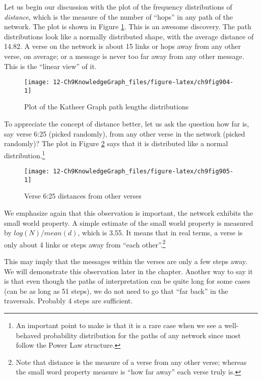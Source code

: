 \documentclass[
]{article}
\begin{document}
Let us begin our discussion with the plot of the frequency distributions of \emph{distance}, which is the measure of the number of ``hops'' in any path of the network. The plot is shown in Figure \ref{fig:ch9fig904}. This is an awesome discovery. The path distributions look like a normally distributed shape, with the average distance of 14.82. A verse on the network is about 15 links or hops away from any other verse, on average; or a message is never too far away from any other message. This is the ``linear view'' of it.

\begin{figure}

{\centering \texttt{[image: 12-Ch9KnowledgeGraph\_files/figure-latex/ch9fig904-1]} 

}

\caption{Plot of the Katheer Graph path lengths distributions}\label{fig:ch9fig904}
\end{figure}

To appreciate the concept of distance better, let us ask the question how far is, say verse 6:25 (picked randomly), from any other verse in the network (picked randomly)? The plot in Figure \ref{fig:ch9fig905} says that it is distributed like a normal distribution.\footnote{An important point to make is that it is a rare case when we see a well-behaved probability distribution for the paths of any network since most follow the Power Law structure.}

\begin{figure}

{\centering \texttt{[image: 12-Ch9KnowledgeGraph\_files/figure-latex/ch9fig905-1]} 

}

\caption{Verse 6:25 distances from other verses}\label{fig:ch9fig905}
\end{figure}

We emphasize again that this observation is important, the network exhibits the small world property. A simple estimate of the small world property is measured by \(log(N)/mean(d)\), which is 3.55. It means that in real terms, a verse is only about 4 links or steps away from ``each other''.\footnote{Note that distance is the measure of a verse from any other verse; whereas the small word property measure is ``how far away'' each verse truly is.}

This may imply that the messages within the verses are only a few steps away. We will demonstrate this observation later in the chapter. Another way to say it is that even though the paths of interpretation can be quite long for some cases (can be as long as 51 steps), we do not need to go that ``far back'' in the traversals. Probably 4 steps are sufficient.
\end{document}
